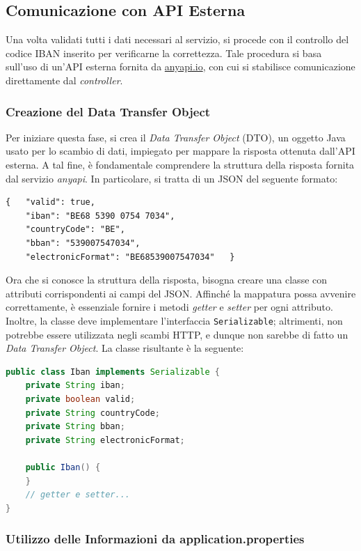 \subsection{Comunicazione con API Esterna}

Una volta validati tutti i dati necessari al servizio, si procede con il controllo del codice IBAN inserito per verificarne la correttezza. Tale procedura si basa sull’uso di un’API esterna fornita da \href{http://anyapi.io/}{anyapi.io}, con cui si stabilisce comunicazione direttamente dal \textit{controller}.

\subsubsection{Creazione del Data Transfer Object}

Per iniziare questa fase, si crea il \textit{Data Transfer Object} (DTO), un oggetto Java usato per lo scambio di dati, impiegato per mappare la risposta ottenuta dall’API esterna. A tal fine, è fondamentale comprendere la struttura della risposta fornita dal servizio \textit{anyapi}. In particolare, si tratta di un JSON del seguente formato:
\begin{lstlisting}[caption=Struttura del JSON restituito dall'API esterna.]
{   "valid": true,
    "iban": "BE68 5390 0754 7034",
    "countryCode": "BE",
    "bban": "539007547034",
    "electronicFormat": "BE68539007547034"   }
\end{lstlisting}
Ora che si conosce la struttura della risposta, bisogna creare una classe con attributi corrispondenti ai campi del JSON. Affinché la mappatura possa avvenire correttamente, è essenziale fornire i metodi \textit{getter} e \textit{setter} per ogni attributo. Inoltre, la classe deve implementare l’interfaccia \texttt{Serializable}; altrimenti, non potrebbe essere utilizzata negli scambi HTTP, e dunque non sarebbe di fatto un \textit{Data Transfer Object}. La classe risultante è la seguente:
\begin{lstlisting}[language=Java, caption=Classe \textit{Data Transfer Object} utilizzata per mappare la risposta dell'API esterna.]
public class Iban implements Serializable {
    private String iban;
    private boolean valid;
    private String countryCode;
    private String bban;
    private String electronicFormat;

    public Iban() {
    }
	// getter e setter...
}
\end{lstlisting}

\subsubsection{Utilizzo delle Informazioni da application.properties}

